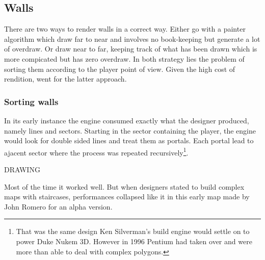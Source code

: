 \subsection{Walls}
There are two ways to render walls in a correct way. Either go with a painter algorithm which draw far to near and involves no book-keeping but generate a lot of overdraw. Or draw near to far, keeping track of what has been drawn which is more compicated but has zero overdraw. In both strategy lies the problem of sorting them according to the player point of view. Given the high cost of rendition, \doom went for the latter approach.\\
\par

\subsubsection{Sorting walls}
In its early instance the engine consumed exactly what the designer produced, namely lines and sectors. Starting in the sector containing the player, the engine would look for double sided lines and treat them as portals. Each portal lead to ajacent sector where the process was repeated recursively\footnote{That was the same design Ken Silverman's build engine would settle on to power Duke Nukem 3D. However in 1996 Pentium had taken over and were more than able to deal with complex polygons.}.\\
\par
DRAWING\\
\par
Most of the time it worked well. But when designers stated to build complex maps with staircases, performances collapsed like it in this early map made by John Romero for an alpha version.\\
\par
{} \label{HUD_screenshot}
\par
{}
\par
